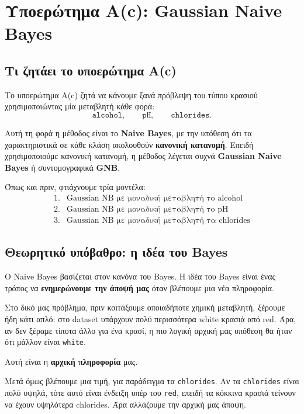 \documentclass[11pt,a4paper]{article}
\newcommand{\code}[1]{\texttt{#1}}
\begin{document}
\section{Υποερώτημα Α(c): Gaussian Naive Bayes}

\subsection{Τι ζητάει το υποερώτημα Α(c)}

Το υποερώτημα Α(c) ζητά να κάνουμε ξανά πρόβλεψη του τύπου κρασιού
χρησιμοποιώντας μία μεταβλητή κάθε φορά:
\[
\code{alcohol}, \qquad \code{pH}, \qquad \code{chlorides}.
\]

Αυτή τη φορά η μέθοδος είναι το \textbf{Naive Bayes}, με την υπόθεση ότι τα
χαρακτηριστικά σε κάθε κλάση ακολουθούν \textbf{κανονική κατανομή}. Επειδή
χρησιμοποιούμε κανονική κατανομή, η μέθοδος λέγεται συχνά
\textbf{Gaussian Naive Bayes} ή συντομογραφικά \textbf{GNB}.

Όπως και πριν, φτιάχνουμε τρία μοντέλα:
\[
\begin{array}{ll}
1. & \text{Gaussian NB με μοναδική μεταβλητή το alcohol} \\
2. & \text{Gaussian NB με μοναδική μεταβλητή το pH} \\
3. & \text{Gaussian NB με μοναδική μεταβλητή τα chlorides}
\end{array}
\]

\subsection{Θεωρητικό υπόβαθρο: η ιδέα του Bayes}

Ο Naive Bayes βασίζεται στον κανόνα του Bayes. Η ιδέα του Bayes είναι ένας
τρόπος να \textbf{ενημερώνουμε την άποψή μας} όταν βλέπουμε μια νέα
πληροφορία.

Στο δικό μας πρόβλημα, πριν κοιτάξουμε οποιαδήποτε χημική μεταβλητή, ξέρουμε
ήδη κάτι απλό: στο dataset υπάρχουν πολύ περισσότερα white κρασιά από red.
Άρα, αν δεν ξέραμε τίποτα άλλο για ένα κρασί, η πιο λογική αρχική μας
υπόθεση θα ήταν ότι μάλλον είναι \code{white}.

Αυτή είναι η \textbf{αρχική πληροφορία} μας.

Μετά όμως βλέπουμε μια τιμή, για παράδειγμα τα \code{chlorides}. Αν τα
\code{chlorides} είναι πολύ υψηλά, τότε αυτό είναι ένδειξη υπέρ του
\code{red}, επειδή τα κόκκινα κρασιά τείνουν να έχουν υψηλότερα chlorides.
Άρα αλλάζουμε την αρχική μας άποψη.
\end{document}
